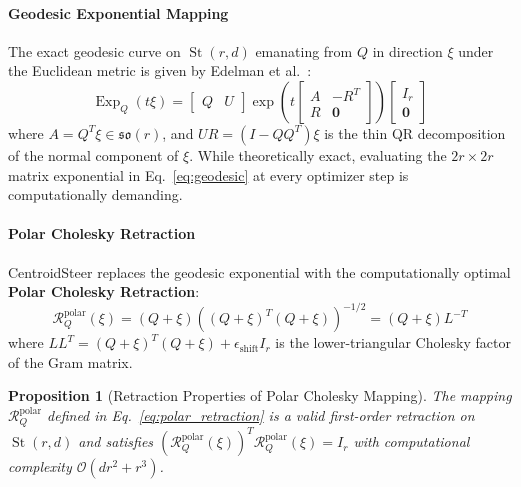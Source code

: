 \documentclass[10pt,twocolumn,letterpaper]{article}
\newtheorem{proposition}{Proposition}
\begin{document}
\paragraph{Geodesic Exponential Mapping} The exact geodesic curve on $\operatorname{St}(r, d)$ emanating from $Q$ in direction $\xi$ under the Euclidean metric is given by Edelman et al.~\cite{edelman1998geometry}:
\begin{equation}
    \operatorname{Exp}_Q(t \xi) = \begin{bmatrix} Q & U \end{bmatrix} \exp \left( t \begin{bmatrix} A & -R^T \\ R & \mathbf{0} \end{bmatrix} \right) \begin{bmatrix} I_r \\ \mathbf{0} \end{bmatrix} \label{eq:geodesic}
\end{equation}
where $A = Q^T \xi \in \mathfrak{so}(r)$, and $U R = (I - Q Q^T) \xi$ is the thin QR decomposition of the normal component of $\xi$. While theoretically exact, evaluating the $2r \times 2r$ matrix exponential in Eq.~\eqref{eq:geodesic} at every optimizer step is computationally demanding.

\paragraph{Polar Cholesky Retraction} CentroidSteer replaces the geodesic exponential with the computationally optimal \textbf{Polar Cholesky Retraction}:
\begin{equation}
    \mathcal{R}_Q^{\text{polar}}(\xi) = (Q + \xi) \left( (Q + \xi)^T (Q + \xi) \right)^{-1/2} = (Q + \xi) L^{-T} \label{eq:polar_retraction}
\end{equation}
where $L L^T = (Q + \xi)^T (Q + \xi) + \epsilon_{\text{shift}} I_r$ is the lower-triangular Cholesky factor of the Gram matrix. 

\begin{proposition}[Retraction Properties of Polar Cholesky Mapping]
The mapping $\mathcal{R}_Q^{\text{polar}}$ defined in Eq.~\eqref{eq:polar_retraction} is a valid first-order retraction on $\operatorname{St}(r, d)$ and satisfies $\left( \mathcal{R}_Q^{\text{polar}}(\xi) \right)^T \mathcal{R}_Q^{\text{polar}}(\xi) = I_r$ with computational complexity $\mathcal{O}(d r^2 + r^3)$.
\end{proposition}
\end{document}
